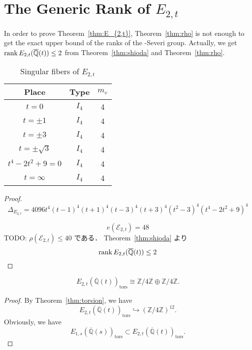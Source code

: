 \documentclass[main]{subfiles}
\begin{document}
\chapter{The Generic Rank of $E_{2,t}$}

In order to prove Theorem~\ref{thm:E_{2,t}}, Theorem~\ref{thm:rho} is not enough to get the exact upper bound of the ranks of the \Neron-Severi group.
Actually, we get $\operatorname{rank} E_{2,t}(\overline{\mathbb{Q}}(t)) \leq 2$ from Theorem~\ref{thm:shioda} and Theorem~\ref{thm:rho}.
\begin{table}[h]
    \centering
    \caption{Singular fibers of $E_{2,t}$}
    \begin{tabular}{|c|c|c|}
        \hline
        Place            & Type  & $m_v$ \\
        \hline
        $t=0$            & $I_4$ & 4     \\
        $t=\pm 1$        & $I_4$ & 4     \\
        $t=\pm 3$        & $I_4$ & 4     \\
        $t=\pm \sqrt{3}$ & $I_4$ & 4     \\
        $t^4-2t^2+9=0$   & $I_4$ & 4     \\
        $t=\infty$       & $I_4$ & 4     \\
        \hline
    \end{tabular}
\end{table}
\begin{proof}
    \begin{equation}
        \Delta_{E_{2,t}} = 4096t^{4}(t - 1)^{4}(t + 1)^{4}(t - 3)^{4}(t + 3)^{4}(t^{2} - 3)^{4}(t^{4} - 2t^{2} + 9)^{4}
    \end{equation}

    \begin{equation}
        e(\mathcal{E}_{2,t}) = 48
    \end{equation}
    TODO: $\rho(\mathcal{E}_{2,t}) \leq 40$ である．
    Theorem~\ref{thm:shioda} より
    \begin{equation}
        \operatorname{rank} E_{2,t}(\overline{\mathbb{Q}}(t)) \leq 2
    \end{equation}
\end{proof}

\begin{lem}
    \begin{equation}
        E_{2,t}(\overline{\mathbb{Q}}(t))_{\text{tors}} \cong \mathbb{Z} / 4 \mathbb{Z} \oplus \mathbb{Z} / 4 \mathbb{Z}.
    \end{equation}
\end{lem}
\begin{proof}
    By Theorem~\ref{thm:torsion}, we have
    \begin{equation}
        E_{2,t}(\overline{\mathbb{Q}}(t))_{\text{tors}} \hookrightarrow (\mathbb{Z} / 4 \mathbb{Z})^{12}.
    \end{equation}
    Obviously, we have
    \begin{equation}
        E_{1,s}(\overline{\mathbb{Q}}(s))_{\text{tors}} \subset E_{2,t}(\overline{\mathbb{Q}}(t))_{\text{tors}}.
    \end{equation}
\end{proof}
\end{document}
